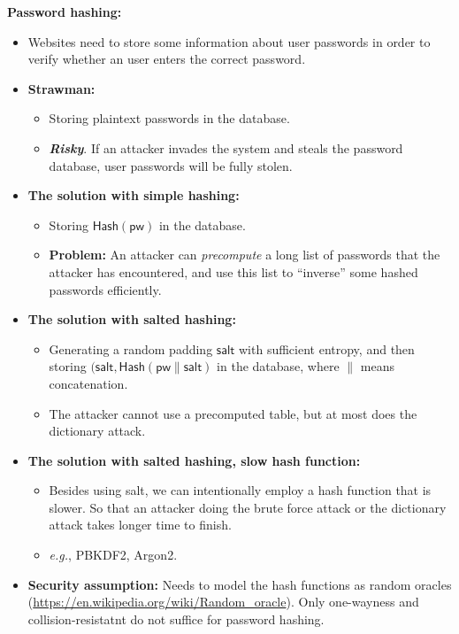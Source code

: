 \documentclass{article}
\newcommand{\msf}[1]{\mathsf{#1}}
\newcommand{\parhead}[1]{\noindent \textbf{#1}}
\begin{document}
\parhead{Password hashing:}
\begin{itemize}
    \item Websites need to store some information about user passwords in order to verify whether an user enters the correct password.
    
    \item {\bf Strawman:}
    \begin{itemize}
        \item Storing plaintext passwords in the database.
        
        \item {\color{red} \bf \emph{Risky}}. If an attacker invades the system and steals the password database, user passwords will be fully stolen. 
    \end{itemize}
    
    \item {\bf The solution with simple hashing:}
    \begin{itemize}
        \item Storing $\msf{Hash}(\msf{pw})$ in the database.
        
        \item {\bf Problem:} An attacker can \emph{precompute} a long list of passwords that the attacker has encountered, and use this list to ``inverse'' some hashed passwords efficiently. 
    \end{itemize}
    
    \item {\bf The solution with salted hashing:}
    \begin{itemize}
        \item Generating a random padding $\msf{salt}$ with sufficient entropy, and then storing $(\msf{salt},\msf{Hash}(\msf{pw}\parallel\msf{salt})$ in the database, where $\parallel$ means concatenation. 
        
        \item The attacker cannot use a precomputed table, but at most does the dictionary attack.
    \end{itemize}
    
    \item {\bf The solution with salted hashing, slow hash function:}
    \begin{itemize}
        \item Besides using salt, we can intentionally employ a hash function that is slower. So that an attacker doing the brute force attack or the dictionary attack takes longer time to finish.
        
        \item \emph{e.g.}, PBKDF2, Argon2. 
    \end{itemize}
    
    \item {\bf Security assumption:} Needs to model the hash functions as random oracles (\href{https://en.wikipedia.org/wiki/Random_oracle}{https://en.wikipedia.org/wiki/Random\_oracle}). Only one-wayness and collision-resistatnt do not suffice for password hashing. 
\end{itemize}
\end{document}
